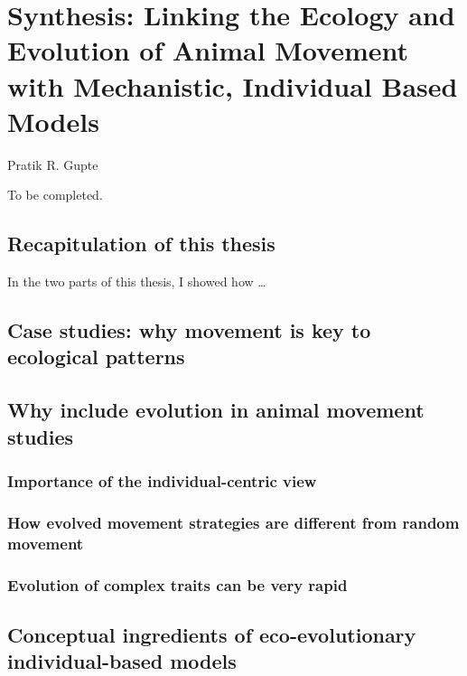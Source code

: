 
{}%
\chapter{Synthesis: Linking the Ecology and Evolution of Animal Movement with Mechanistic, Individual Based Models}\label{ch:discussion}

{{Pratik R. Gupte}}

To be completed.

\newrefcontext[sorting=ynt]

\section*{Recapitulation of this thesis}

In the two parts of this thesis, I showed how \ldots 

\section*{Case studies: why movement is key to ecological patterns}

\section*{Why include evolution in animal movement studies}

\subsection*{Importance of the individual-centric view}

\subsection*{How evolved movement strategies are different from random movement}

\subsection*{Evolution of complex traits can be very rapid}

\section*{Conceptual ingredients of eco-evolutionary individual-based models}

